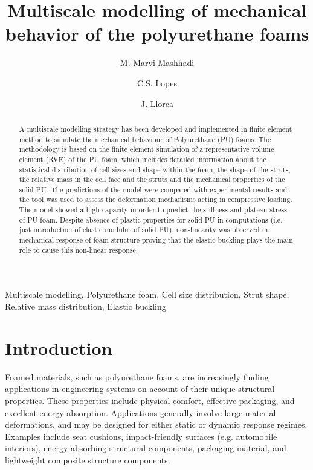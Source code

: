 \documentclass[review]{elsarticle}
\begin{document}
\begin{frontmatter}

\title{Multiscale modelling of mechanical behavior of the polyurethane foams}

\author[add1]{M. Marvi-Mashhadi}
\author[add1]{C.S. Lopes}
\author[add1,add2]{J. Llorca}
\address[add1]{IMDEA Materials Institute, Calle Eric Kandel 2, Tecnogetafe, 28906, Getafe, Madrid, Spain}
\address[add2]{Department of Materials Science, Polytechnic University of Madrid, 28040 Madrid, Spain}

\begin{abstract}

A multiscale modelling strategy has been developed and implemented in finite element method to simulate the mechanical behaviour of Polyurethane (PU) foams. The methodology is based on the finite element simulation of a representative volume element (RVE) of the PU foam, which includes detailed information about the statistical distribution of cell sizes and shape within the foam, the shape of the struts, the relative mass in the cell face and the struts and the mechanical properties of the solid PU. The predictions of the model were compared with experimental results and the tool was used to assess the deformation mechanisms acting in compressive loading. The model showed a high capacity in order to predict the stiffness and plateau stress of PU foam. Despite absence of plastic properties for solid PU in computations (i.e. just introduction of elastic modulus of solid PU), non-linearity was observed in mechanical response of foam structure proving that the elastic buckling plays the main role to cause this non-linear response. 
\end{abstract}

\begin{keyword}
Multiscale modelling, Polyurethane foam, Cell size distribution, Strut shape, Relative mass distribution, Elastic buckling
\end{keyword}

\end{frontmatter}

\linenumbers

\section{Introduction}
Foamed materials, such as polyurethane foams, are increasingly finding applications in engineering systems on account of their unique structural properties. These properties include physical comfort, effective packaging, and excellent energy absorption. Applications generally involve large material deformations, and may be designed for either static or dynamic response regimes. Examples include seat cushions, impact-friendly surfaces (e.g. automobile interiors), energy absorbing structural components, packaging material, and lightweight composite structure components. 
\end{document}
